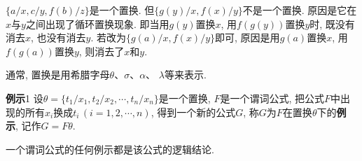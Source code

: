\begin{example}
  $\{a/x, c/y, f(b)/z\}$是一个置换. 但$\{g(y)/x, f(x)/y\}$不是一个置换. 原因是它在$x$与$y$之间出现了循环置换现象. 即当用$g(y)$置换$x$, 用$f(g(y))$置换$y$时, 既没有消去$x$, 也没有消去$y$.
若改为$\{g(a)/x, f(x)/y\}$即可, 原因是用$g(a)$置换$x$, 用$f(g(a))$置换$y$, 则消去了$x$和$y$.
\end{example}

\begin{remark}
    通常, 置换是用希腊字母$\theta$、$\sigma$、$\alpha$、 $\lambda$等来表示.
\end{remark}
\begin{mydef}{\textbf{例示}}{1}
设$\theta =\{t_1/x_1,t_2/x_2,\cdots,t_n/x_n\}$是一个置换, $F$是一个谓词公式, 把公式$F$中出现的所有$x_i$换成$t_i\,(i=1,2,\cdots,n)$, 得到一个新的公式$G$, 称$G$为$F$在置换$\theta $下的\textbf{例示}, 记作$G=F\theta $.
\end{mydef}
\begin{remark}
    一个谓词公式的任何例示都是该公式的逻辑结论.
\end{remark}

